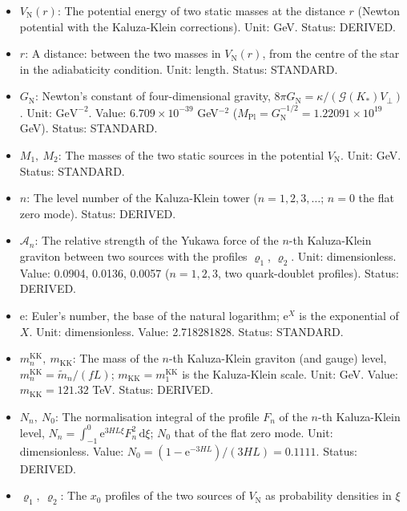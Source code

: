\documentclass[
  10pt,
]{article}
\providecommand{\tightlist}{%
  \setlength{\itemsep}{0pt}\setlength{\parskip}{0pt}}
\begin{document}
\begin{itemize}
\tightlist
\item
  \(V_{\mathrm{N}}(r)\): The potential energy of two static masses at
  the distance \(r\) (Newton potential with the Kaluza-Klein
  corrections). Unit: GeV. Status: DERIVED.
\item
  \(r\): A distance: between the two masses in \(V_{\mathrm{N}}(r)\),
  from the centre of the star in the adiabaticity condition. Unit:
  length. Status: STANDARD.
\item
  \(G_{\mathrm{N}}\): Newton's constant of four-dimensional gravity,
  \(8\pi G_{\mathrm{N}} = \kappa/(\mathcal{G}(K_*)V_\perp)\). Unit:
  \(\mathrm{GeV}^{-2}\). Value: \(6.709\times10^{-39}\) GeV\(^{-2}\)
  (\(M_{\mathrm{Pl}} = G_{\mathrm{N}}^{-1/2} = 1.22091\times10^{19}\)
  GeV). Status: STANDARD.
\item
  \(M_1,\ M_2\): The masses of the two static sources in the potential
  \(V_{\mathrm{N}}\). Unit: GeV. Status: STANDARD.
\item
  \(n\): The level number of the Kaluza-Klein tower
  (\(n = 1, 2, 3, \dots\); \(n = 0\) the flat zero mode). Status:
  DERIVED.
\item
  \(\mathcal{A}_n\): The relative strength of the Yukawa force of the
  \(n\)-th Kaluza-Klein graviton between two sources with the profiles
  \(\varrho_1\), \(\varrho_2\). Unit: dimensionless. Value: 0.0904,
  0.0136, 0.0057 (\(n = 1, 2, 3\), two quark-doublet profiles). Status:
  DERIVED.
\item
  \(\mathrm{e}\): Euler's number, the base of the natural logarithm;
  \(\mathrm{e}^{X}\) is the exponential of \(X\). Unit: dimensionless.
  Value: 2.718281828. Status: STANDARD.
\item
  \(m^{\mathrm{KK}}_n,\ m_{\mathrm{KK}}\): The mass of the \(n\)-th
  Kaluza-Klein graviton (and gauge) level,
  \(m^{\mathrm{KK}}_n = \tilde m_n/(fL)\);
  \(m_{\mathrm{KK}} = m^{\mathrm{KK}}_1\) is the Kaluza-Klein scale.
  Unit: GeV. Value: \(m_{\mathrm{KK}} = 121.32\) TeV. Status: DERIVED.
\item
  \(N_n,\ N_0\): The normalisation integral of the profile \(F_n\) of
  the \(n\)-th Kaluza-Klein level,
  \(N_n = \int_{-1}^{0}\mathrm{e}^{3HL\xi}F_n^2\,\mathrm{d}\xi\);
  \(N_0\) that of the flat zero mode. Unit: dimensionless. Value:
  \(N_0 = (1 - \mathrm{e}^{-3HL})/(3HL) = 0.1111\). Status: DERIVED.
\item
  \(\varrho_1,\ \varrho_2\): The \(x_0\) profiles of the two sources of
  \(V_{\mathrm{N}}\) as probability densities in \(\xi\)

\end{itemize}
\end{document}
